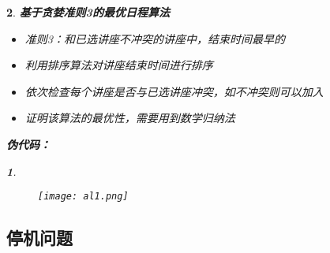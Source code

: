 \documentclass[UTF8]{report}
\theoremstyle{MyLineTheoremStyle} %
\theoremstyle{MyBlockTheoremStyle} %
\theoremstyle{MySubsubsectionStyle} %
\newtheorem{definition}{}
\begin{document}
\begin{definition}
    \textbf{基于贪婪准则3的最优日程算法}\par
    \begin{itemize}
        \item 准则3：和已选讲座不冲突的讲座中，结束时间最早的
        \item 利用排序算法对讲座结束时间进行排序
        \item 依次检查每个讲座是否与已选讲座冲突，如不冲突则可以加入
        \item 证明该算法的最优性，需要用到数学归纳法
    \end{itemize}

    \textbf{伪代码：}\par
    \begin{definition}
        \begin{figure}[ht]
            \centering
            \texttt{[image: al1.png]}
        \end{figure}
    \end{definition}
\end{definition}

\subsection{停机问题}
\end{document}

